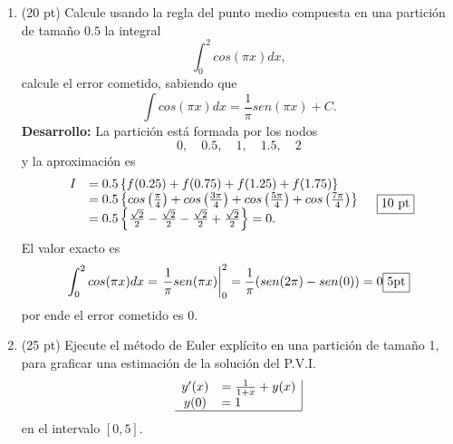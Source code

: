 \documentclass[11pt]{article}
\begin{document}
\begin{enumerate}
\newpage 
\item  (20 pt)
Calcule usando la regla del punto medio compuesta en una partici\'on de tama\~{n}o $0.5$ la integral
$$
\int_0^2 cos(\pi x) dx,
$$
calcule el error cometido, sabiendo que 
$$
\int cos(\pi x)dx = \frac{1}{\pi}sen(\pi x) +C.
$$
\textbf{Desarrollo:} La partici\'on est\'a formada por los nodos 
$$
0, \quad 0.5, \quad 1, \quad 1.5, \quad 2
$$
y la aproximaci\'on es
$$
\begin{array}{cl}
I 	&= 0.5 \left\{ f(0.25)+f(0.75)+f(1.25)+f(1.75)\right\} \\
	&= 0.5 \left\{ 	cos\left(\frac{\pi}{4}\right)
    				+cos\left(\frac{3\pi}{4}\right)
                    +cos\left(\frac{5\pi}{4}\right)
                    +cos\left(\frac{7\pi}{4}\right)\right\} \\
  	&= 0.5 \left\{ 	\frac{\sqrt{2}}{2}
    				-\frac{\sqrt{2}}{2}
                    -\frac{\sqrt{2}}{2}
                    +\frac{\sqrt{2}}{2}\right\}=0. 
\end{array}\quad \fbox{10 pt}
$$
El valor exacto es 
$$
\displaystyle
\int_0^2 cos(\pi x) dx = \left.\frac{1}{\pi} sen(\pi x)\right|_0^2=\frac{1}{\pi} (sen(2\pi)-sen(0))=0 \fbox{5pt}
$$
por ende el error cometido es $0$. \fbox{5pt}

\item  (25 pt) Ejecute el m\'etodo de Euler expl\'icito en una partici\'on de tamaño 1, para graficar una estimaci\'on de la soluci\'on del P.V.I.
$$
\begin{array}{cl|}
y'(x)	& =\frac{1}{1+x}+y(x)\\
y(0)	& =1 \\ \hline
\end{array}
$$
en el intervalo $[0,5]$.


\end{enumerate}
\end{document}
